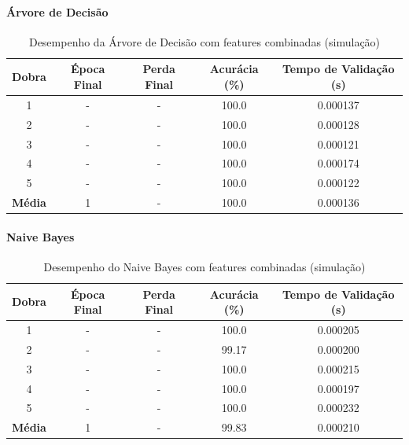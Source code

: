 \paragraph{Árvore de Decisão}

\begin{table}[H]
\centering
\caption{Desempenho da Árvore de Decisão com features combinadas (simulação)}
\label{tab:arvore_features_combinadas}
\begin{tabular}{ccccc}
\hline
\textbf{Dobra} & \textbf{Época Final} & \textbf{Perda Final} & \textbf{Acurácia (\%)} & \textbf{Tempo de Validação (s)} \\
\hline
1 & - & -       & 100.0 & 0.000137 \\
2 & - & -       & 100.0 & 0.000128 \\
3 & - & -       & 100.0 & 0.000121 \\
4 & - & -       & 100.0 & 0.000174 \\
5 & - & -       & 100.0 & 0.000122 \\
\hline
\textbf{Média} & 1 & -      & 100.0 & 0.000136 \\
\hline
\end{tabular}
\fonte{}
\end{table}

\paragraph{Naive Bayes}

\begin{table}[H]
\centering
\caption{Desempenho do Naive Bayes com features combinadas (simulação)}
\label{tab:naive_bayes_features_combinadas}
\begin{tabular}{ccccc}
\hline
\textbf{Dobra} & \textbf{Época Final} & \textbf{Perda Final} & \textbf{Acurácia (\%)} & \textbf{Tempo de Validação (s)} \\
\hline
1 & - & -       & 100.0 & 0.000205 \\
2 & - & -       & 99.17 & 0.000200 \\
3 & - & -       & 100.0 & 0.000215 \\
4 & - & -       & 100.0 & 0.000197 \\
5 & - & -       & 100.0 & 0.000232 \\
\hline
\textbf{Média} & 1 & -      & 99.83 & 0.000210 \\
\hline
\end{tabular}
\fonte{}
\end{table}



